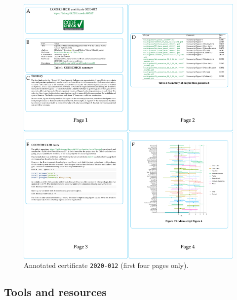 \documentclass[12pt]{article}
\begin{document}
\begin{figure}
  \centering
  \includegraphics[width=\textwidth]{figs/annotate-cert-crop.pdf}
  \caption{Annotated certificate \texttt{2020-012} \cite{cert-2020-012} (first four pages only).}
  \label{fig:cert}
\end{figure}

\subsection*{Tools and resources}\label{tools}
\end{document}
